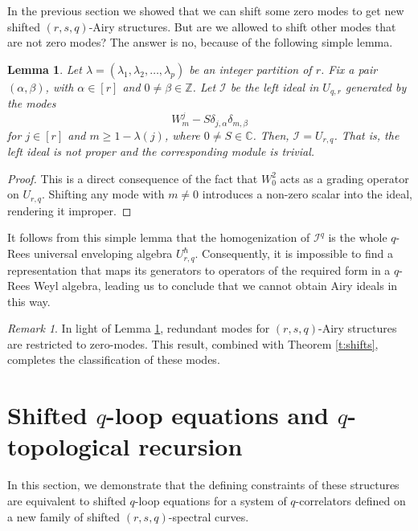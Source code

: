 \documentclass[reqno,11pt]{amsart}
\theoremstyle{plain}
\newtheorem{lemma}[theorem]{Lemma}
\theoremstyle{definition}
\theoremstyle{remark}
\newtheorem{remark}[theorem]{Remark}
\numberwithin{equation}{section}
\newcommand{\1}{\mathds{1}}
\newcommand{\2}{\frac{1}{2}}
\begin{document}
{				In the previous section we showed that we can shift some zero modes to get new shifted $(r,s,q)$-Airy structures. But are we allowed to shift other modes that are not zero modes? The answer is no, because of the following simple lemma.
				
				\begin{lemma}\label{l:othershifts}
					Let $\lambda = (\lambda_1, \lambda_2, \ldots, \lambda_p)$ be an integer partition of $r$.  Fix a pair $(\alpha,\beta)$, with $\alpha \in [r]$ and $0 \neq \beta \in \mathbb{Z}$. Let $\mathcal{I}$ be the left ideal in $U_{q,r}$ generated by the modes \begin{equation}
						W^j_m - S  \delta_{j,\alpha} \delta_{m,\beta}\end{equation}
					for $j \in [r]$ and $m \geq 1 - \lambda(j)$, where $0 \neq S \in \mathbb{C}$. Then, $\mathcal{I} = U_{r,q}$. That is, the left ideal is not proper and the corresponding module is trivial.
				\end{lemma}
				\begin{proof}
					This is a direct consequence of the fact that $W^2_0$ acts as a grading operator on $U_{r,q}$. Shifting any mode with $m\neq 0$ introduces a non-zero scalar into the ideal, rendering it improper.
				\end{proof}
				It follows from this simple lemma that the homogenization of $\mathcal{I}^q$ is the whole $q$-Rees universal enveloping algebra $U_{r,q}^\hslash$. Consequently, it is impossible to find a representation that maps its generators to operators of the required form in a $q$-Rees Weyl algebra, leading us to conclude that we cannot obtain Airy ideals in this way.
				
				\begin{remark}
					In light of Lemma \ref{l:othershifts}, redundant modes for $(r,s,q)$-Airy structures are restricted to zero-modes. This result, combined with Theorem \ref{t:shifts}, completes the classification of these modes.
				\end{remark}
				\section{Shifted $q$-loop equations and  $q$-topological recursion}
				\label{s:shiftedle}
				In this section, we demonstrate that the defining constraints of these structures are equivalent to shifted $q$-loop equations for a system of $q$-correlators defined on a new family of shifted $(r,s,q)$-spectral curves.
				
}
\end{document}
